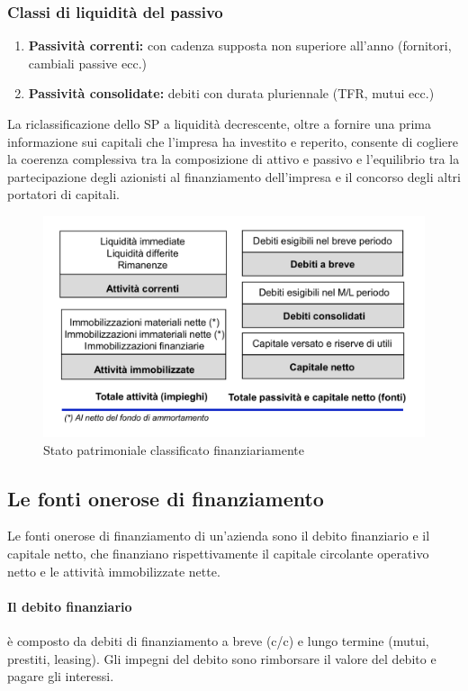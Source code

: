 \documentclass{report}
\begin{document}
	\subsubsection{Classi di liquidità del passivo}
	\begin{enumerate}
		\item \textbf{Passività correnti:} con cadenza supposta non superiore all'anno (fornitori, cambiali passive ecc.)
		\item \textbf{Passività consolidate:} debiti con durata pluriennale (TFR, mutui ecc.)
	\end{enumerate}
	La riclassificazione dello SP a liquidità decrescente, oltre a fornire una prima informazione sui capitali che l'impresa ha investito e reperito, consente di cogliere la coerenza complessiva tra la composizione di attivo e passivo e l'equilibrio tra la partecipazione degli azionisti al finanziamento dell'impresa e il concorso degli altri portatori di capitali.
	\newline
	\begin{figure}[h]
		\centering
		\includegraphics[width=0.7\linewidth]{images/sp}
		\caption{Stato patrimoniale classificato finanziariamente}
		\label{fig:sp}
	\end{figure}
	\subsection{Le fonti onerose di finanziamento}
	Le fonti onerose di finanziamento di un'azienda sono il debito finanziario e il capitale netto, che finanziano rispettivamente il capitale circolante operativo netto e le attività immobilizzate nette.
	\paragraph{Il debito finanziario} è composto da debiti di finanziamento a breve (c/c) e lungo termine (mutui, prestiti, leasing). Gli impegni del debito sono rimborsare il valore del debito e pagare gli interessi.
\end{document}
